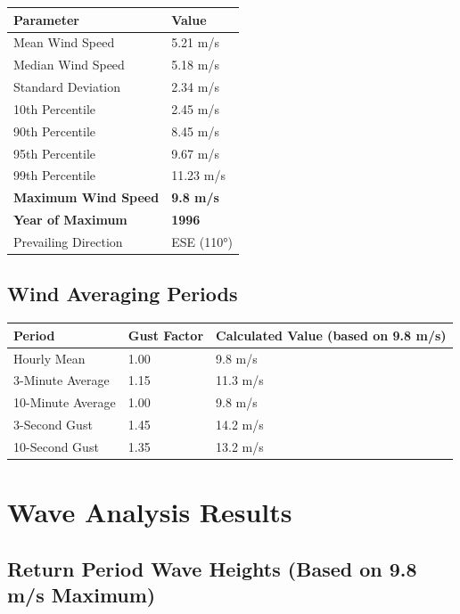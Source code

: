 \documentclass[12pt]{article}
\begin{document}
\begin{center}
\begin{tabular}{|l|l|}
\hline
\textbf{Parameter} & \textbf{Value} \\
\hline
Mean Wind Speed & 5.21 m/s \\
Median Wind Speed & 5.18 m/s \\
Standard Deviation & 2.34 m/s \\
10th Percentile & 2.45 m/s \\
90th Percentile & 8.45 m/s \\
95th Percentile & 9.67 m/s \\
99th Percentile & 11.23 m/s \\
\textbf{Maximum Wind Speed} & \textbf{9.8 m/s} \\
\textbf{Year of Maximum} & \textbf{1996} \\
Prevailing Direction & ESE (110°) \\
\hline
\end{tabular}
\end{center}

\subsection{Wind Averaging Periods}

\begin{center}
\begin{tabular}{|l|l|l|}
\hline
\textbf{Period} & \textbf{Gust Factor} & \textbf{Calculated Value (based on 9.8 m/s)} \\
\hline
Hourly Mean & 1.00 & 9.8 m/s \\
3-Minute Average & 1.15 & 11.3 m/s \\
10-Minute Average & 1.00 & 9.8 m/s \\
3-Second Gust & 1.45 & 14.2 m/s \\
10-Second Gust & 1.35 & 13.2 m/s \\
\hline
\end{tabular}
\end{center}

\newpage

\section{Wave Analysis Results}

\subsection{Return Period Wave Heights (Based on 9.8 m/s Maximum)}
\end{document}

